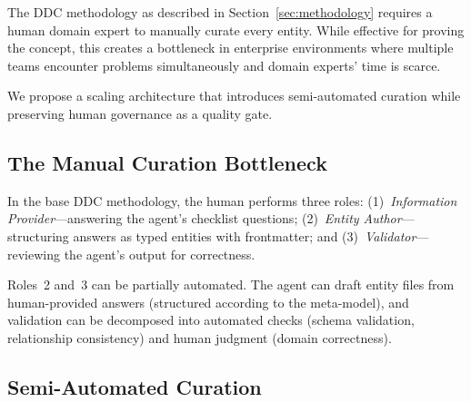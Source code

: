 \documentclass[11pt,a4paper]{article}
\begin{document}
The DDC methodology as described in Section~\ref{sec:methodology} requires a human domain expert to manually curate every entity. While effective for proving the concept, this creates a bottleneck in enterprise environments where multiple teams encounter problems simultaneously and domain experts' time is scarce.

We propose a scaling architecture that introduces semi-automated curation while preserving human governance as a quality gate.

%

\subsection{The Manual Curation Bottleneck}

In the base DDC methodology, the human performs three roles: (1)~\emph{Information Provider}---answering the agent's checklist questions; (2)~\emph{Entity Author}---structuring answers as typed entities with frontmatter; and (3)~\emph{Validator}---reviewing the agent's output for correctness.

Roles~2 and~3 can be partially automated. The agent can draft entity files from human-provided answers (structured according to the meta-model), and validation can be decomposed into automated checks (schema validation, relationship consistency) and human judgment (domain correctness).

\subsection{Semi-Automated Curation}
\end{document}
